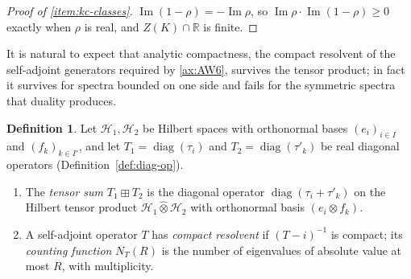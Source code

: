 \documentclass[11pt]{amsart}
\theoremstyle{plain}
\theoremstyle{definition}
\newtheorem{definition}[theorem]{Definition}
\theoremstyle{remark}
\numberwithin{equation}{section}
\newcommand{\R}{\mathbb{R}}
\newcommand{\cH}{\mathscr{H}}
\DeclareMathOperator{\Ima}{Im}
\DeclareMathOperator{\diag}{diag}
\renewcommand{\Im}{\Ima}
\begin{document}
\begin{proof}[Proof of \ref{item:kc-classes}]
$\Im(1-\rho)=-\Im\rho$, so $\Im\rho\cdot\Im(1-\rho)\ge0$ exactly when
$\rho$ is real, and $Z(K)\cap\R$ is finite.
\end{proof}

It is natural to expect that analytic compactness, the compact
resolvent of the self-adjoint generators required by \ref{ax:AW6},
survives the tensor product; in fact it survives for spectra bounded on
one side and fails for the symmetric spectra that duality produces.

\begin{definition}\label{def:tensor-diag}
Let $\cH_1,\cH_2$ be Hilbert spaces with orthonormal bases
$(e_i)_{i\in I}$ and $(f_k)_{k\in I'}$, and let $T_1=\diag(\tau_i)$ and
$T_2=\diag(\tau'_k)$ be real diagonal operators
(Definition~\ref{def:diag-op}).
\begin{enumerate}[label=(\alph*)]
\item The \emph{tensor sum} $T_1\boxplus T_2$ is the diagonal operator
  $\diag(\tau_i+\tau'_k)$ on the Hilbert tensor product
  $\cH_1\widehat\otimes\cH_2$ with orthonormal basis
  $(e_i\otimes f_k)$.
\item A self-adjoint operator $T$ has \emph{compact resolvent} if
  $(T-i)^{-1}$ is compact; its \emph{counting function} $N_T(R)$ is the
  number of eigenvalues of absolute value at most $R$, with multiplicity.
\end{enumerate}
\end{definition}
\end{document}
